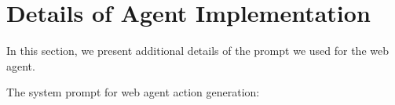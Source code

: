 \documentclass[11pt]{article}
\begin{document}


\appendix


\section{Details of Agent Implementation}\label{app:agent_details}






In this section, we present additional details of the prompt we used for the web agent.


The system prompt for web agent action generation:
\end{document}

